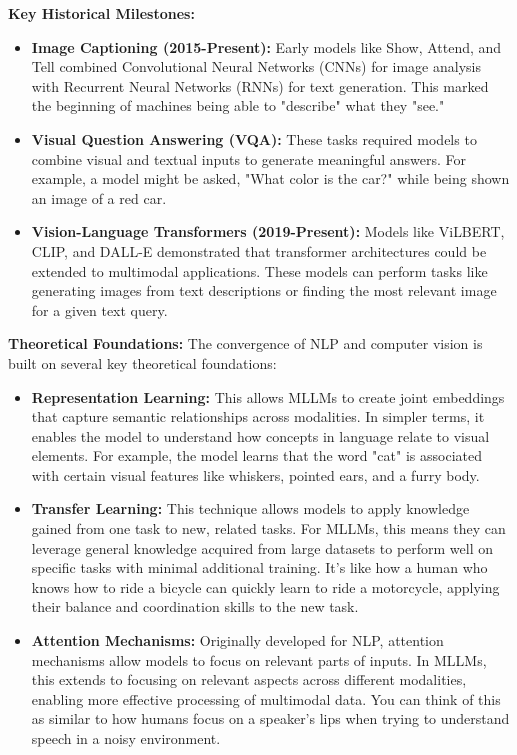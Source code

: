 \textbf{Key Historical Milestones:}
\begin{itemize}
    \item \textbf{Image Captioning (2015-Present):} Early models like Show, Attend, and Tell combined Convolutional Neural Networks (CNNs) for image analysis with Recurrent Neural Networks (RNNs) for text generation. This marked the beginning of machines being able to "describe" what they "see."
    \item \textbf{Visual Question Answering (VQA):} These tasks required models to combine visual and textual inputs to generate meaningful answers. For example, a model might be asked, "What color is the car?" while being shown an image of a red car.
    \item \textbf{Vision-Language Transformers (2019-Present):} Models like ViLBERT, CLIP, and DALL-E demonstrated that transformer architectures could be extended to multimodal applications. These models can perform tasks like generating images from text descriptions or finding the most relevant image for a given text query.
\end{itemize}

\textbf{Theoretical Foundations:}
The convergence of NLP and computer vision is built on several key theoretical foundations:

\begin{itemize}
    \item \textbf{Representation Learning:} This allows MLLMs to create joint embeddings that capture semantic relationships across modalities. In simpler terms, it enables the model to understand how concepts in language relate to visual elements. For example, the model learns that the word "cat" is associated with certain visual features like whiskers, pointed ears, and a furry body.
    
    \item \textbf{Transfer Learning:} This technique allows models to apply knowledge gained from one task to new, related tasks. For MLLMs, this means they can leverage general knowledge acquired from large datasets to perform well on specific tasks with minimal additional training. It's like how a human who knows how to ride a bicycle can quickly learn to ride a motorcycle, applying their balance and coordination skills to the new task.
    
    \item \textbf{Attention Mechanisms:} Originally developed for NLP, attention mechanisms allow models to focus on relevant parts of inputs. In MLLMs, this extends to focusing on relevant aspects across different modalities, enabling more effective processing of multimodal data. You can think of this as similar to how humans focus on a speaker's lips when trying to understand speech in a noisy environment.
\end{itemize}

